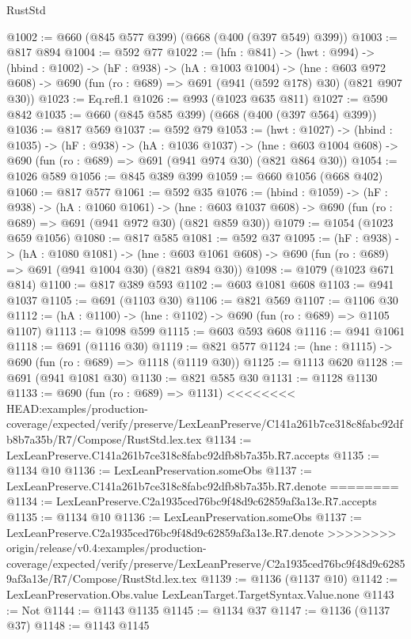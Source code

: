 \begin{lexlean}{RustStd}
\begin{coremodule}
{\begin{coremodule}
@1002 := @660 (@845 @577 @399) (@668 (@400 (@397 @549) @399))
@1003 := @817 @894
@1004 := @592 @77
@1022 := (hfn : @841) ->
  (hwt : @994) ->
  (hbind : @1002) ->
  (hF : @938) ->
  (hA : @1003 @1004) ->
  (hne : @603 @972 @608) -> @690 (fun (ro : @689) => @691 (@941 (@592 @178) @30) (@821 @907 @30))
@1023 := Eq.refl.{1}
@1026 := @993 (@1023 @635 @811)
@1027 := @590 @842
@1035 := @660 (@845 @585 @399) (@668 (@400 (@397 @564) @399))
@1036 := @817 @569
@1037 := @592 @79
@1053 := (hwt : @1027) ->
  (hbind : @1035) ->
  (hF : @938) ->
  (hA : @1036 @1037) ->
  (hne : @603 @1004 @608) -> @690 (fun (ro : @689) => @691 (@941 @974 @30) (@821 @864 @30))
@1054 := @1026 @589
@1056 := @845 @389 @399
@1059 := @660 @1056 (@668 @402)
@1060 := @817 @577
@1061 := @592 @35
@1076 := (hbind : @1059) ->
  (hF : @938) ->
  (hA : @1060 @1061) ->
  (hne : @603 @1037 @608) -> @690 (fun (ro : @689) => @691 (@941 @972 @30) (@821 @859 @30))
@1079 := @1054 (@1023 @659 @1056)
@1080 := @817 @585
@1081 := @592 @37
@1095 := (hF : @938) ->
  (hA : @1080 @1081) ->
  (hne : @603 @1061 @608) -> @690 (fun (ro : @689) => @691 (@941 @1004 @30) (@821 @894 @30))
@1098 := @1079 (@1023 @671 @814)
@1100 := @817 @389 @593
@1102 := @603 @1081 @608
@1103 := @941 @1037
@1105 := @691 (@1103 @30)
@1106 := @821 @569
@1107 := @1106 @30
@1112 := (hA : @1100) -> (hne : @1102) -> @690 (fun (ro : @689) => @1105 @1107)
@1113 := @1098 @599
@1115 := @603 @593 @608
@1116 := @941 @1061
@1118 := @691 (@1116 @30)
@1119 := @821 @577
@1124 := (hne : @1115) -> @690 (fun (ro : @689) => @1118 (@1119 @30))
@1125 := @1113 @620
@1128 := @691 (@941 @1081 @30)
@1130 := @821 @585 @30
@1131 := @1128 @1130
@1133 := @690 (fun (ro : @689) => @1131)
<<<<<<<< HEAD:examples/production-coverage/expected/verify/preserve/LexLeanPreserve/C141a261b7ce318c8fabc92dfb8b7a35b/R7/Compose/RustStd.lex.tex
@1134 := LexLeanPreserve.C141a261b7ce318c8fabc92dfb8b7a35b.R7.accepts
@1135 := @1134 @10
@1136 := LexLeanPreservation.someObs
@1137 := LexLeanPreserve.C141a261b7ce318c8fabc92dfb8b7a35b.R7.denote
========
@1134 := LexLeanPreserve.C2a1935ced76bc9f48d9c62859af3a13e.R7.accepts
@1135 := @1134 @10
@1136 := LexLeanPreservation.someObs
@1137 := LexLeanPreserve.C2a1935ced76bc9f48d9c62859af3a13e.R7.denote
>>>>>>>> origin/release/v0.4:examples/production-coverage/expected/verify/preserve/LexLeanPreserve/C2a1935ced76bc9f48d9c62859af3a13e/R7/Compose/RustStd.lex.tex
@1139 := @1136 (@1137 @10)
@1142 := LexLeanPreservation.Obs.value LexLeanTarget.TargetSyntax.Value.none
@1143 := Not
@1144 := @1143 @1135
@1145 := @1134 @37
@1147 := @1136 (@1137 @37)
@1148 := @1143 @1145

\end{coremodule}}
\end{coremodule}
\end{lexlean}
